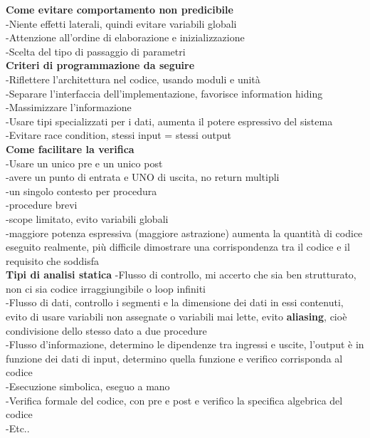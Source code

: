 \documentclass{article}
\begin{document}
				\textbf{Come evitare comportamento non predicibile}\\
				-Niente effetti laterali, quindi evitare variabili globali\\
				-Attenzione all'ordine di elaborazione e inizializzazione\\
				-Scelta del tipo di passaggio di parametri\\
				
				\textbf{Criteri di programmazione da seguire}\\
				-Riflettere l'architettura nel codice, usando moduli e unità\\
				-Separare l'interfaccia dell'implementazione, favorisce information hiding\\
				-Massimizzare l'informazione\\
				-Usare tipi specializzati per i dati, aumenta il potere espressivo del sistema\\
				-Evitare race condition, stessi input = stessi output\\
				
				\textbf{Come facilitare la verifica}\\
				-Usare un unico pre e un unico post\\
				-avere un punto di entrata e UNO di uscita, no return multipli\\
				-un singolo contesto per procedura\\
				-procedure brevi\\
				-scope limitato, evito variabili globali\\
				-maggiore potenza espressiva (maggiore astrazione) aumenta la quantità di codice eseguito realmente, più difficile dimostrare una corrispondenza tra il codice e il requisito che soddisfa\\
				
				\textbf{Tipi di analisi statica}
				-Flusso di controllo, mi accerto che sia ben strutturato, non ci sia codice irraggiungibile o loop infiniti\\
				-Flusso di dati, controllo i segmenti e la dimensione dei dati in essi contenuti, evito di usare variabili non assegnate o variabili mai lette, evito \textbf{aliasing}, cioè condivisione dello stesso dato a due procedure\\
				-Flusso d'informazione, determino le dipendenze tra ingressi e uscite, l'output è in funzione dei dati di input, determino quella funzione e verifico corrisponda al codice\\
				-Esecuzione simbolica, eseguo a mano\\
				-Verifica formale del codice, con pre e post e verifico la specifica algebrica del codice\\
				-Etc..\\
				
\end{document}
